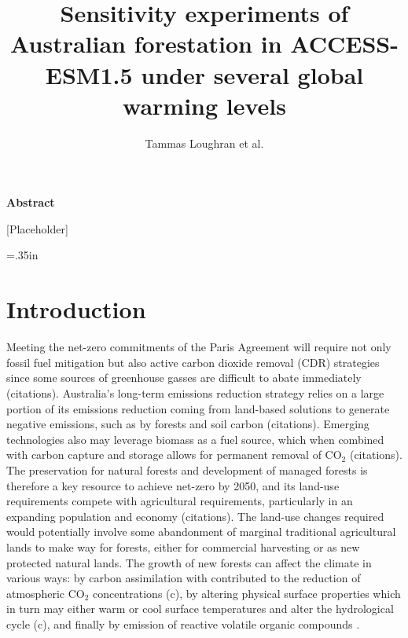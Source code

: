 \documentclass[]{article}
\title{Sensitivity experiments of Australian forestation in ACCESS-ESM1.5 under several global warming levels}
\author{Tammas Loughran et al.}
\begin{document}
\maketitle

\begin{center}
    \Large
    \vspace{0.9cm}
    \textbf{Abstract}
\end{center}

[Placeholder]

\raggedright
\parindent=.35in %

\section{Introduction}

Meeting the net-zero commitments of the Paris Agreement will require not only fossil fuel mitigation but also active carbon dioxide removal (CDR) strategies since some sources of greenhouse gasses are difficult to abate immediately (citations).
Australia's long-term emissions reduction strategy relies on a large portion of its emissions reduction coming from land-based solutions to generate negative emissions, such as by forests and soil carbon (citations).
Emerging technologies also may leverage biomass as a fuel source, which when combined with carbon capture and storage allows for permanent removal of CO$_2$ (citations).
The preservation for natural forests and development of managed forests is therefore a key resource to achieve net-zero by 2050, and its land-use requirements compete with agricultural requirements, particularly in an expanding population and economy (citations).
The land-use changes required would potentially involve some abandonment of marginal traditional agricultural lands to make way for forests, either for commercial harvesting or as new protected natural lands.
The growth of new forests can affect the climate in various ways: by carbon assimilation with contributed to the reduction of atmospheric CO$_2$ concentrations (c), by altering physical surface properties which in turn may either warm or cool surface temperatures and alter the hydrological cycle (c), and finally by emission of reactive volatile organic compounds \parencite{weber_chemistry_albedo_2024}.


\end{document}
